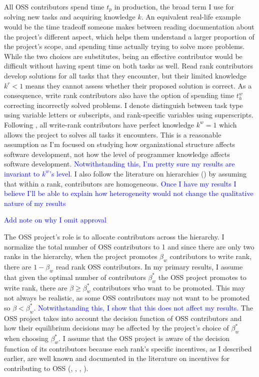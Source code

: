 \documentclass[12pt,notitlepage]{article}
\begin{document}
\qquad  All OSS contributors spend time $t_p$ in production, the broad term I use for solving new tasks and acquiring knowledge $k$.  An equivalent real-life example would be the time tradeoff someone makes between reading documentation about the project's different aspect, which helps them understand a larger proportion of the project's scope, and spending time actually trying to solve more problems. While the two choices are substitutes, being an effective contributor would be difficult without having spent time on both tasks as well. Read rank contributors develop solutions for all tasks that they encounter, but their limited knowledge $k^r < 1$ means they cannot assess whether their proposed solution is correct. As a consequence, write rank contributors also have the option of spending time $t_h^w$ correcting incorrectly solved problems. I denote distinguish between task type using variable letters or subscripts, and rank-specific variables using superscripts. Following \cite{bloom_distinct_2014},  all write-rank contributors have perfect knowledge $k^w = 1$ which allows the project to solves all tasks it encounters. This is a reasonable assumption as I'm focused on studying how organizational structure affects software development, not how the level of programmer knowledge affects software development. \textcolor{blue}{Notwithstanding this, I'm pretty sure my results are invariant to $k^w$'s level}. I also follow the literature on hierarchies (\cite{garicano_hierarchies_2000}) by assuming that within a rank, contributors are homogeneous. \textcolor{blue}{Once I have my results I believe I'll be able to explain how heterogeneity would not change the qualitative nature of my results}

\qquad \textcolor{blue}{Add note on why I omit approval}

\qquad  The OSS project's role is to allocate contributors across the hierarchy. I normalize the total number of OSS contributors to 1 and since there are only two ranks in the hierarchy, when the project promotes $\beta_w$ contributors to write rank, there are $1 - \beta_w$ read rank OSS contributors. In my primary results, I assume that given the optimal number of contributors $\beta_w^*$ the OSS project promotes to write rank, there are $\beta \geq \beta_w^*$  contributors who want to be promoted. This may not always be realistic, as some OSS contributors may not want to be promoted so $\beta < \beta_w^*$. \textcolor{blue}{Notwithstanding this, I show that this does not affect my results}. The OSS project takes into account the decision function of OSS contributors and how their equilibrium decisions may be affected by the project's choice of $\beta_w^*$ when choosing $\beta_w^*$. I assume that the OSS project is aware of the decision function of its contributors because each rank's specific incentives, as I described earlier, are well known and documented in the literature on incentives for contributing to OSS (\cite{lerner_simple_2002}, \cite{lakhani_how_2003}, \cite{von_krogh_community_2003}, \cite{robert_g_wolf_why_2003}). 
\end{document}

